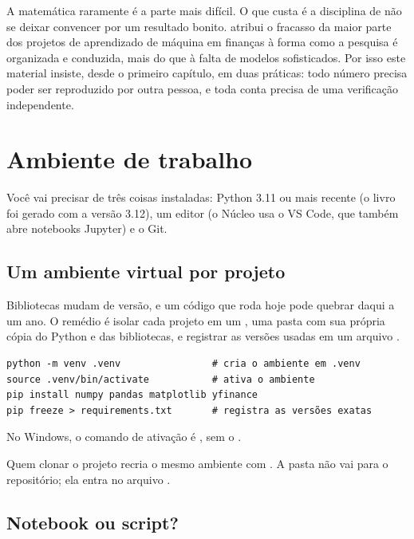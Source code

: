 A matemática raramente é a parte mais difícil. O que custa é a disciplina de não se deixar convencer por um resultado bonito. \citet{lopezdeprado2018} atribui o fracasso da maior parte dos projetos de aprendizado de máquina em finanças à forma como a pesquisa é organizada e conduzida, mais do que à falta de modelos sofisticados. Por isso este material insiste, desde o primeiro capítulo, em duas práticas: todo número precisa poder ser reproduzido por outra pessoa, e toda conta precisa de uma verificação independente.

\section{Ambiente de trabalho}

Você vai precisar de três coisas instaladas: Python 3.11 ou mais recente (o livro foi gerado com a versão 3.12), um editor (o Núcleo usa o VS Code, que também abre notebooks Jupyter) e o Git.

\subsection{Um ambiente virtual por projeto}

Bibliotecas mudam de versão, e um código que roda hoje pode quebrar daqui a um ano. O remédio é isolar cada projeto em um , uma pasta com sua própria cópia do Python e das bibliotecas, e registrar as versões usadas em um arquivo .

\begin{lstlisting}[style=terminal]
python -m venv .venv                # cria o ambiente em .venv
source .venv/bin/activate           # ativa o ambiente
pip install numpy pandas matplotlib yfinance
pip freeze > requirements.txt       # registra as versões exatas
\end{lstlisting}

No Windows, o comando de ativação é , sem o .

Quem clonar o projeto recria o mesmo ambiente com . A pasta  não vai para o repositório; ela entra no arquivo .

\subsection{Notebook ou script?}

